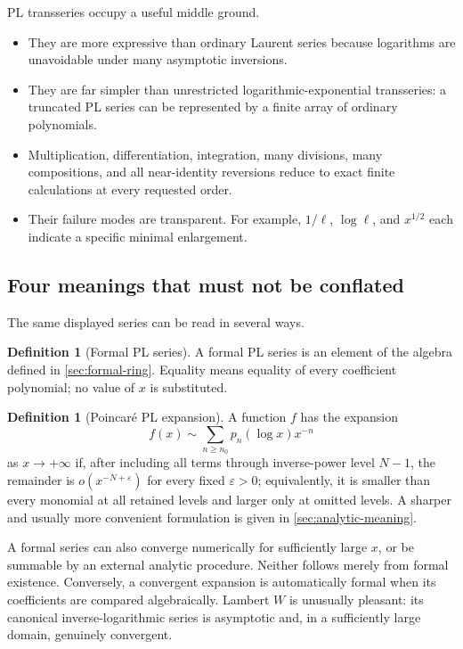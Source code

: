 \documentclass[11pt,oneside]{article}
\numberwithin{equation}{section}
\theoremstyle{definition}
\newtheorem{definition}[theorem]{Definition}
\newcommand{\as}{\sim}
\begin{document}
PL transseries occupy a useful middle ground.
\begin{itemize}
\item They are more expressive than ordinary Laurent series because logarithms
  are unavoidable under many asymptotic inversions.
\item They are far simpler than unrestricted logarithmic-exponential transseries:
  a truncated PL series can be represented by a finite array of ordinary
  polynomials.
\item Multiplication, differentiation, integration, many divisions, many
  compositions, and all near-identity reversions reduce to exact finite
  calculations at every requested order.
\item Their failure modes are transparent.  For example, \(1/\ell\),
  \(\log\ell\), and \(x^{1/2}\) each indicate a specific minimal enlargement.
\end{itemize}

\subsection{Four meanings that must not be conflated}

The same displayed series can be read in several ways.

\begin{definition}[Formal PL series]
A formal PL series is an element of the algebra defined in
\cref{sec:formal-ring}.  Equality means equality of every coefficient polynomial;
no value of \(x\) is substituted.
\end{definition}

\begin{definition}[Poincar\'e PL expansion]
A function \(f\) has the expansion
\[
  f(x)\as\sum_{n\ge n_0}p_n(\log x)x^{-n}
\]
as \(x\to+\infty\) if, after including all terms through inverse-power level
\(N-1\), the remainder is \(o(x^{-N+\varepsilon})\) for every fixed
\(\varepsilon>0\); equivalently, it is smaller than every monomial at all
retained levels and larger only at omitted levels.  A sharper and usually more
convenient formulation is given in \cref{sec:analytic-meaning}.
\end{definition}

A formal series can also converge numerically for sufficiently large \(x\), or
be summable by an external analytic procedure.  Neither follows merely from
formal existence.  Conversely, a convergent expansion is automatically formal
when its coefficients are compared algebraically.  Lambert \(W\) is unusually
pleasant: its canonical inverse-logarithmic series is asymptotic and, in a
sufficiently large domain, genuinely convergent.
\end{document}
